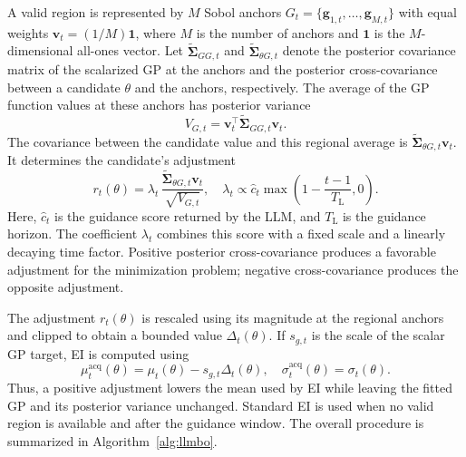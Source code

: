 \documentclass[journal,10pt]{IEEEtran}
\begin{document}
A valid region is represented by $M$ Sobol anchors
$G_t=\{\mathbf g_{1,t},\ldots,\mathbf g_{M,t}\}$ with equal weights
$\mathbf v_t=(1/M)\mathbf 1$, where $M$ is the number of anchors and
$\mathbf 1$ is the $M$-dimensional all-ones vector. Let
$\widetilde{\boldsymbol\Sigma}_{GG,t}$ and
$\widetilde{\boldsymbol\Sigma}_{\theta G,t}$ denote the posterior covariance
matrix of the scalarized GP at the anchors and the posterior cross-covariance
between a candidate $\theta$ and the anchors, respectively. The average of
the GP function values at these anchors has posterior variance
\begin{equation}
 V_{G,t}=\mathbf v_t^{\top}
 \widetilde{\boldsymbol\Sigma}_{GG,t}\mathbf v_t.
 \label{eq:region_variance}
\end{equation}
The covariance between the candidate value and this regional average is
$\widetilde{\boldsymbol\Sigma}_{\theta G,t}\mathbf v_t$. It determines the
candidate's adjustment
\begin{equation}
 r_t(\theta)=
 \lambda_t\,
 \frac{\widetilde{\boldsymbol\Sigma}_{\theta G,t}\mathbf v_t}
 {\sqrt{V_{G,t}}},
 \quad
 \lambda_t\propto
 \widehat c_t\max\!\left(1-\frac{t-1}{T_{\mathrm L}},0\right).
 \label{eq:region_adjustment}
\end{equation}
Here, $\widehat c_t$ is the guidance score returned by the LLM, and
$T_{\mathrm L}$ is the guidance horizon. The coefficient $\lambda_t$ combines
this score with a fixed scale and a linearly decaying time factor. Positive posterior
cross-covariance produces a favorable adjustment for the minimization
problem; negative cross-covariance produces the opposite adjustment.

The adjustment $r_t(\theta)$ is rescaled using its magnitude at the regional
anchors and clipped to obtain a bounded value $\Delta_t(\theta)$. If
$s_{g,t}$ is the scale of the scalar GP target, EI is computed using
\begin{equation}
 \mu_t^{\mathrm{acq}}(\theta)
 =\mu_t(\theta)-s_{g,t}\Delta_t(\theta),
 \quad
 \sigma_t^{\mathrm{acq}}(\theta)=\sigma_t(\theta).
 \label{eq:region_acq_mean}
\end{equation}
Thus, a positive adjustment lowers the mean used by EI while leaving the
fitted GP and its posterior variance unchanged. Standard EI is used when no
valid region is available and after the guidance window.
The overall procedure is summarized in Algorithm~\ref{alg:llmbo}.
\end{document}
